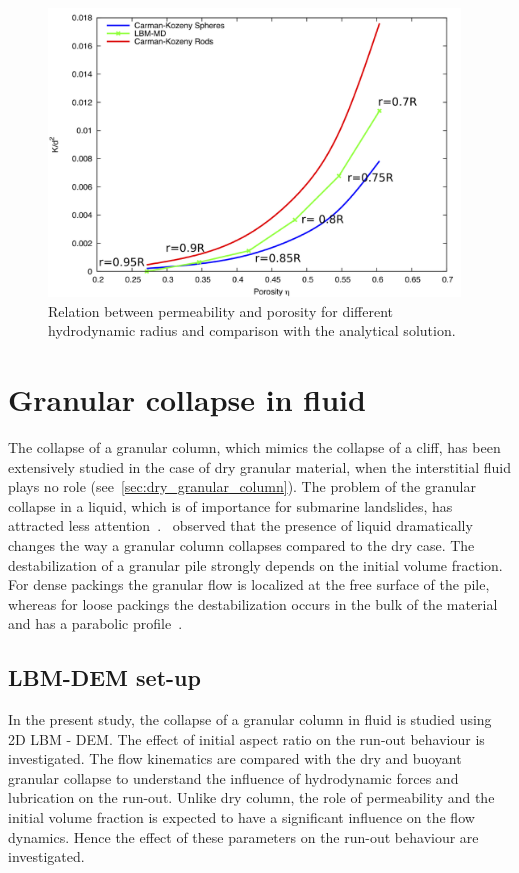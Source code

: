 \begin{figure}[htpb]
\centering
\includegraphics[width=0.975\textwidth]{Carman}
\caption{Relation between permeability and porosity for 
different hydrodynamic radius and comparison with the analytical solution.}
\label{fig:Carman}
\end{figure}


\section{Granular collapse in fluid}

The collapse of a granular column, which mimics the
collapse of a cliff, has been extensively studied in the case of
dry granular material, when the interstitial fluid plays no
role (see~\cref{sec:dry_granular_column}). The problem of the granular collapse 
in a liquid, which is of importance for submarine landslides, has attracted 
less attention~\citep{Rondon2011}.~\citet{Thompson2007} 
observed that the presence of liquid dramatically changes the way a granular 
column collapses compared to the dry case. The destabilization of a granular 
pile strongly depends on the initial volume fraction. For dense 
packings the granular flow is localized at the free surface of the pile, 
whereas for loose packings the destabilization occurs in the bulk of the
material and has a parabolic profile~\citep{Bonnet2010,Topin2011,Iverson2000}. 

\subsection{LBM-DEM set-up}

In the present study, the collapse of a granular column in fluid is studied 
using 2D LBM - DEM. The effect of initial aspect ratio on the run-out behaviour 
is investigated. The flow kinematics are compared with the dry and buoyant 
granular collapse to understand the influence of hydrodynamic forces and 
lubrication on the run-out. Unlike dry column, the role of permeability and the 
initial volume fraction is expected to have a significant influence on the flow 
dynamics. Hence the effect of these parameters on the run-out behaviour are 
investigated.

